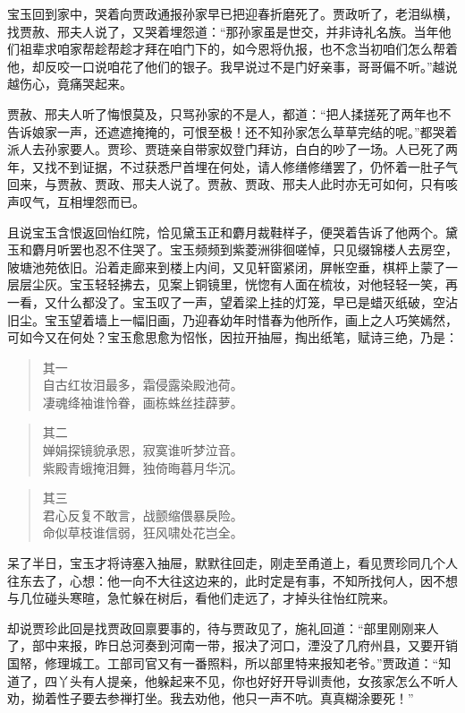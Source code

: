 \documentclass[12pt,oneside]{book}
\newenvironment{shici}{%
\begin{verse}%
\centering\large\hspace{12pt}}%
{\end{verse}}
\begin{document}
宝玉回到家中，哭着向贾政通报孙家早已把迎春折磨死了。贾政听了，老泪纵横，找贾赦、邢夫人说了，又哭着埋怨道：“那孙家虽是世交，并非诗礼名族。当年他们祖辈求咱家帮趁帮趁才拜在咱门下的，如今恩将仇报，也不念当初咱们怎么帮着他，却反咬一口说咱花了他们的银子。我早说过不是门好亲事，哥哥偏不听。”越说越伤心，竟痛哭起来。

贾赦、邢夫人听了悔恨莫及，只骂孙家的不是人，都道：“把人揉搓死了两年也不告诉娘家一声，还遮遮掩掩的，可恨至极！还不知孙家怎么草草完结的呢。”都哭着派人去孙家要人。贾珍、贾琏亲自带家奴登门拜访，白白的吵了一场。人已死了两年，又找不到证据，不过获悉尸首埋在何处，请人修缮修缮罢了，仍怀着一肚子气回来，与贾赦、贾政、邢夫人说了。贾赦、贾政、邢夫人此时亦无可如何，只有咳声叹气，互相埋怨而已。

且说宝玉含恨返回怡红院，恰见黛玉正和麝月裁鞋样子，便哭着告诉了他两个。黛玉和麝月听罢也忍不住哭了。宝玉频频到紫菱洲徘徊嗟悼，只见缀锦楼人去房空，陂塘池苑依旧。沿着走廊来到楼上内间，又见轩窗紧闭，屏帐空垂，棋枰上蒙了一层层尘灰。宝玉轻轻拂去，见案上铜镜里，恍惚有人面在梳妆，对他轻轻一笑，再一看，又什么都没了。宝玉叹了一声，望着梁上挂的灯笼，早已是蜡灭纸破，空沾旧尘。宝玉望着墙上一幅旧画，乃迎春幼年时惜春为他所作，画上之人巧笑嫣然，可如今又在何处？宝玉愈思愈为怊怅，因拉开抽屉，掏出纸笔，赋诗三绝，乃是：

\begin{shici}
其一\\
自古红妆泪最多，霜侵露染殿池荷。\\
凄魂绛袖谁怜眷，画栋蛛丝挂薜萝。
\end{shici}

\begin{shici}
其二\\
婵娟探镜貌承恩，寂寞谁听梦泣音。\\
紫殿青蛾掩泪舞，独倚晦暮月华沉。
\end{shici}


\begin{shici}
其三\\
君心反复不敢言，战颤缩偎暴戾险。\\
命似草枝谁信弱，狂风啸处花岂全。
\end{shici}

呆了半日，宝玉才将诗塞入抽屉，默默往回走，刚走至甬道上，看见贾珍同几个人往东去了，心想：他一向不大往这边来的，此时定是有事，不知所找何人，因不想与几位碰头寒暄，急忙躲在树后，看他们走远了，才掉头往怡红院来。

却说贾珍此回是找贾政回禀要事的，待与贾政见了，施礼回道：“部里刚刚来人了，部中来报，昨日总河奏到河南一带，报决了河口，湮没了几府州县，又要开销国帑，修理城工。工部司官又有一番照料，所以部里特来报知老爷。”贾政道：“知道了，四丫头有人提亲，他躲起来不见，你也好好开导训责他，女孩家怎么不听人劝，拗着性子要去参禅打坐。我去劝他，他只一声不吭。真真糊涂要死！”
\end{document}
